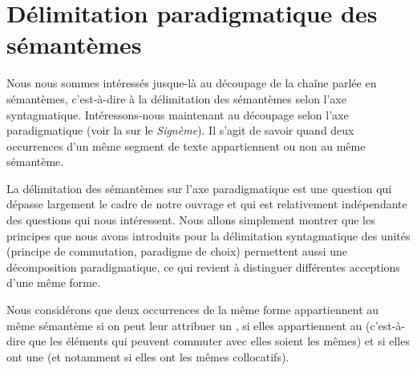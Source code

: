 \section{Délimitation paradigmatique des sémantèmes}\label{sec:2.3.13}

Nous nous sommes intéressés jusque-là au découpage de la chaîne parlée en sémantèmes, c’est-à-dire à la délimitation des sémantèmes selon l’axe syntagmatique. Intéressons-nous maintenant au découpage selon l’axe paradigmatique (voir la  sur le \textit{Signème}). Il s’agit de savoir quand deux occurrences d’un même segment de texte appartiennent ou non au même sémantème.

La délimitation des sémantèmes sur l’axe paradigmatique est une question qui dépasse largement le cadre de notre ouvrage et qui est relativement indépendante des questions qui nous intéressent. Nous allons simplement montrer que les principes que nous avons introduits pour la délimitation syntagmatique des unités (principe de commutation, paradigme de choix) permettent aussi une décomposition paradigmatique, ce qui revient à distinguer différentes acceptions d’une même forme.

Nous considérons que deux occurrences de la même forme appartiennent au même sémantème si on peut leur attribuer un , si elles appartiennent au  (c’est-à-dire que les éléments qui peuvent commuter avec elles soient les mêmes) et si elles ont une  (et notamment si elles ont les mêmes collocatifs).

